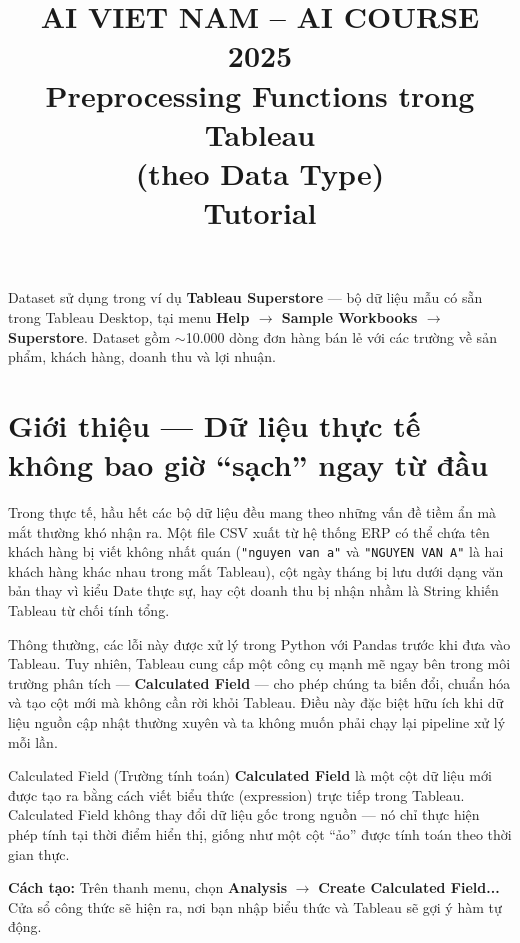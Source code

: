 \documentclass[12pt]{article}
\title{
  \begin{center}
    \Large{AI VIET NAM -- AI COURSE 2025}\\[1ex]
    \Huge\textbf{Preprocessing Functions trong Tableau}\\[0.5ex]
    \large (theo Data Type)\\[1ex]
    \large Tutorial
  \end{center}
}
\author{}
\date{}
\begin{document}
\maketitle

\begin{conceptbox}{Dataset sử dụng trong ví dụ}
\textbf{Tableau Superstore} --- bộ dữ liệu mẫu có sẵn trong Tableau Desktop, tại menu \textbf{Help $\rightarrow$ Sample Workbooks $\rightarrow$ Superstore}. Dataset gồm $\sim$10.000 dòng đơn hàng bán lẻ với các trường về sản phẩm, khách hàng, doanh thu và lợi nhuận.
\end{conceptbox}

\tableofcontents
\newpage

\section{Giới thiệu --- Dữ liệu thực tế không bao giờ ``sạch'' ngay từ đầu}

\noindent Trong thực tế, hầu hết các bộ dữ liệu đều mang theo những vấn đề tiềm ẩn mà mắt thường khó nhận ra. Một file CSV xuất từ hệ thống ERP có thể chứa tên khách hàng bị viết không nhất quán (\texttt{"nguyen van a"} và \texttt{"NGUYEN VAN A"} là hai khách hàng khác nhau trong mắt Tableau), cột ngày tháng bị lưu dưới dạng văn bản thay vì kiểu Date thực sự, hay cột doanh thu bị nhận nhầm là String khiến Tableau từ chối tính tổng.

\noindent Thông thường, các lỗi này được xử lý trong Python với Pandas trước khi đưa vào Tableau. Tuy nhiên, Tableau cung cấp một công cụ mạnh mẽ ngay bên trong môi trường phân tích --- \textbf{Calculated Field} --- cho phép chúng ta biến đổi, chuẩn hóa và tạo cột mới mà không cần rời khỏi Tableau. Điều này đặc biệt hữu ích khi dữ liệu nguồn cập nhật thường xuyên và ta không muốn phải chạy lại pipeline xử lý mỗi lần.

\begin{conceptbox}{Calculated Field (Trường tính toán)}
\textbf{Calculated Field} là một cột dữ liệu mới được tạo ra bằng cách viết biểu thức (expression) trực tiếp trong Tableau. Calculated Field không thay đổi dữ liệu gốc trong nguồn --- nó chỉ thực hiện phép tính tại thời điểm hiển thị, giống như một cột ``ảo'' được tính toán theo thời gian thực.

\noindent \textbf{Cách tạo:} Trên thanh menu, chọn \textbf{Analysis} $\rightarrow$ \textbf{Create Calculated Field...} Cửa sổ công thức sẽ hiện ra, nơi bạn nhập biểu thức và Tableau sẽ gợi ý hàm tự động.
\end{conceptbox}
\end{document}
